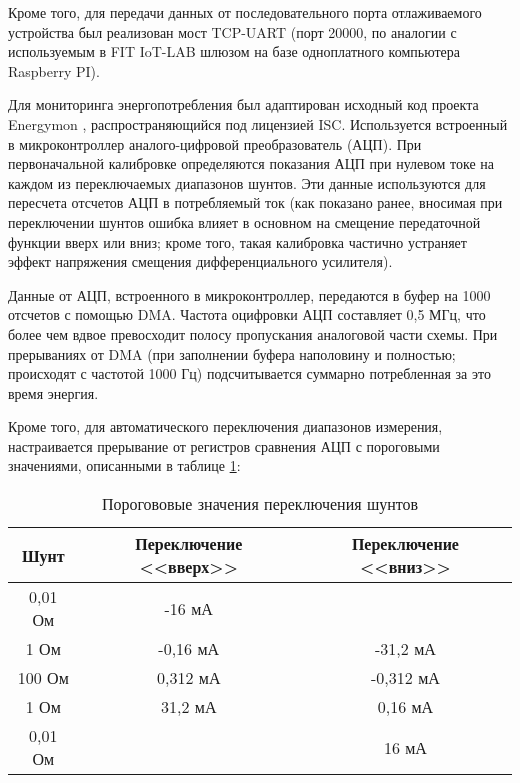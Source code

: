 Кроме того, для передачи данных от последовательного порта отлаживаемого устройства был реализован
мост TCP-UART (порт 20000, по аналогии с используемым в FIT IoT-LAB шлюзом на базе одноплатного 
компьютера Raspberry PI).

Для мониторинга энергопотребления был адаптирован исходный код проекта Energymon \cite{Energymon Code}, 
распространяющийся под лицензией ISC. Используется встроенный в микроконтроллер аналого-цифровой
преобразователь (АЦП). При первоначальной калибровке определяются показания АЦП при нулевом токе на 
каждом из переключаемых диапазонов шунтов. Эти данные используются для пересчета отсчетов АЦП в 
потребляемый ток (как показано ранее, вносимая при переключении шунтов ошибка влияет в основном на 
смещение передаточной функции вверх или вниз; кроме того, такая калибровка частично устраняет эффект
напряжения смещения дифференциального усилителя).

Данные от АЦП, встроенного в микроконтроллер, передаются в буфер на 1000 отсчетов с помощью DMA. 
Частота оцифровки АЦП составляет 0,5 МГц, что более чем вдвое превосходит полосу пропускания 
аналоговой части схемы. При прерываниях от DMA (при заполнении буфера наполовину и полностью; 
происходят с частотой 1000 Гц) подсчитывается суммарно потребленная за это время энергия.

Кроме того, для автоматического переключения диапазонов измерения, настраивается прерывание от 
регистров сравнения АЦП с пороговыми значениями, описанными в таблице \ref{Limits of DAC}:

\begin{table}[H]

    \caption{Порогововые значения переключения шунтов}
    \label{Limits of DAC}   
    \begin{center}
    \begin{tabular}{|c|c|c|}
    \hline
    Шунт & Переключение <<вверх>> & Переключение <<вниз>> \\ \hline
    0,01 Ом & -16 мА &  \\ \hline
    1 Ом  & -0,16 мА & -31,2 мА \\ \hline
    100 Ом & 0,312 мА & -0,312 мА \\ \hline
    1 Ом  & 31,2 мА & 0,16 мА \\ \hline
    0,01 Ом  &  & 16 мА \\ \hline
    \end{tabular}
    \end{center}
\end{table}

